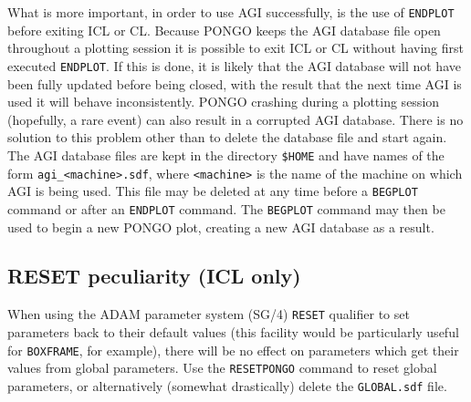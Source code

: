 \documentclass[twoside,11pt]{article}
\newcommand{\htmlref}[2]{#1}
\newcommand{\xref}[3]{#1}
\renewcommand{\_}{\texttt{\symbol{95}}}
\newcommand{\pnam}[1]{{\tt #1}}
\newcommand{\cnam}[1]{{\tt #1}}
\newcommand{\iref} [1]{\htmlref{#1}{#1}}
\begin{document}
What is more important, in order to use AGI successfully, is the use
of \cnam{\iref{ENDPLOT}} before exiting ICL or CL.  Because PONGO keeps the
AGI database file open throughout a plotting session it is possible to
exit ICL or CL without having first executed \cnam{\iref{ENDPLOT}}.  If this
is done, it is likely that the AGI database will not have been fully
updated before being closed, with the result that the next time AGI is
used it will behave inconsistently.  PONGO crashing during a plotting
session (hopefully, a rare event) can also result in a corrupted AGI
database.  There is no solution to this problem other than to delete
the database file and start again.  The AGI database files are kept in
the directory \verb+$HOME+ and have names of the form
\verb+agi_<machine>.sdf+, where \verb+<machine>+ is the name of the
machine on which AGI is being used.  This file may be deleted at any
time before a \cnam{BEGPLOT} command or after an \cnam{ENDPLOT} command.
The \cnam{\iref{BEGPLOT}} command may then be used to begin a new PONGO plot,
creating a new AGI database as a result.


\subsection{RESET peculiarity (ICL only)}

When using the ADAM parameter system \xref{(SG/4)}{sg4}{} \pnam{RESET}
qualifier to set parameters back to their default values (this
facility would be particularly useful for \cnam{\iref{BOXFRAME}}, for
example), there will be no effect on parameters which get their values
from global parameters. Use the \cnam{\iref{RESETPONGO}} command to
reset global parameters, or alternatively (somewhat drastically)
delete the \verb+GLOBAL.sdf+ file.
\end{document}
